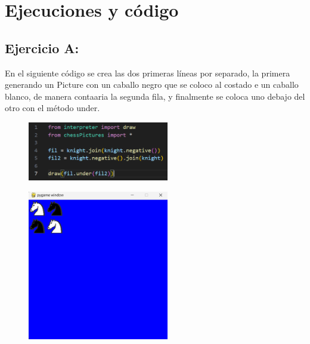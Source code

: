 \documentclass{article}
\begin{document}
	
	
	\clearpage
	
	\section{Ejecuciones y código}
	
	\subsection{Ejercicio A:}
	
	En el siguiente código se crea las dos primeras líneas por separado, la primera generando un Picture con un caballo negro que se coloco al costado e un caballo blanco, de manera contaaria la segunda fila, y finalmente se coloca uno debajo del otro con el método under.
	
	\begin{figure}[H]
		\centering
		\includegraphics[width=0.55\textwidth,keepaspectratio]{img/cap10.png}
	\end{figure}	
	
	\begin{figure}[H]
		\centering
		\includegraphics[width=0.55\textwidth,keepaspectratio]{img/Picture A.png}
	\end{figure}	
	
\end{document}
